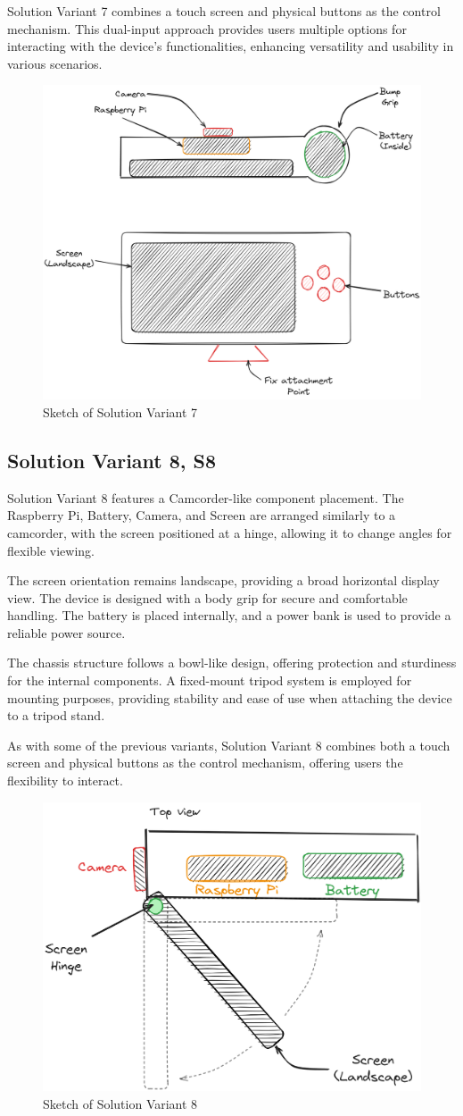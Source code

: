 Solution Variant 7 combines a touch screen and physical buttons as the control mechanism. This dual-input approach provides users multiple options for interacting with the device's functionalities, enhancing versatility and usability in various scenarios.

\begin{figure}[H]
    \centering
    \includegraphics[width=0.5\linewidth]{texs/Part1/chapter3/image/v7.png}
    \caption{Sketch of Solution Variant 7}
    \label{fig:sketch-solution-variant-7}
\end{figure}

\subsection{Solution Variant 8, S8}
Solution Variant 8 features a Camcorder-like component placement. The Raspberry Pi, Battery, Camera, and Screen are arranged similarly to a camcorder, with the screen positioned at a hinge, allowing it to change angles for flexible viewing.

The screen orientation remains landscape, providing a broad horizontal display view. The device is designed with a body grip for secure and comfortable handling. The battery is placed internally, and a power bank is used to provide a reliable power source.

The chassis structure follows a bowl-like design, offering protection and sturdiness for the internal components. A fixed-mount tripod system is employed for mounting purposes, providing stability and ease of use when attaching the device to a tripod stand.

As with some of the previous variants, Solution Variant 8 combines both a touch screen and physical buttons as the control mechanism, offering users the flexibility to interact.

\begin{figure}[H]
    \centering
    \includegraphics[width=0.5\linewidth]{texs/Part1/chapter3/image/v8.png}
    \caption{Sketch of Solution Variant 8}
    \label{fig:sketch-solution-variant-8}
\end{figure}

